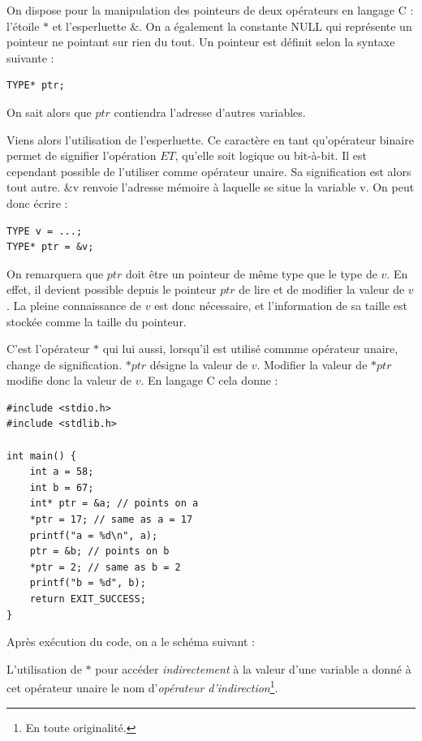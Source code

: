 \documentclass[../../../main.tex]{subfiles}
\begin{document}
On dispose pour la manipulation des pointeurs de deux opérateurs en langage C : l'étoile $\ast$ et l'esperluette $\&$. On a également la constante \textsf{NULL} qui représente un pointeur ne pointant sur rien du tout. 
Un pointeur est définit selon la syntaxe suivante :
\begin{verbatim}
TYPE* ptr;
\end{verbatim}
On sait alors que $ptr$ contiendra l'adresse d'autres variables.
 
Viens alors l'utilisation de l'esperluette. Ce caractère en tant qu'opérateur binaire permet de signifier l'opération $ET$, qu'elle soit logique ou bit-à-bit. Il est cependant possible de l'utiliser comme opérateur unaire. Sa signification est alors tout autre. \textsf{\&v} renvoie l'adresse mémoire à laquelle se situe la variable \textsf{v}. On peut donc écrire :
\begin{verbatim}
TYPE v = ...;
TYPE* ptr = &v;
\end{verbatim}
On remarquera que $ptr$ doit être un pointeur de même type que le type de $v$. En effet, il devient possible depuis le pointeur $ptr$ de lire et de modifier la valeur de $v$. La pleine connaissance de $v$ est donc nécessaire, et l'information de sa taille est stockée comme la taille du pointeur.
 
C'est l'opérateur $*$ qui lui aussi, lorsqu'il est utilisé commme opérateur unaire, change de signification. $*ptr$ désigne la valeur de $v$. Modifier la valeur de $*ptr$ modifie donc la valeur de $v$. En langage C cela donne :
\begin{verbatim}
#include <stdio.h>
#include <stdlib.h>

int main() {
	int a = 58;
	int b = 67;
	int* ptr = &a; // points on a
	*ptr = 17; // same as a = 17
	printf("a = %d\n", a);
	ptr = &b; // points on b
	*ptr = 2; // same as b = 2
	printf("b = %d", b);
	return EXIT_SUCCESS;
}
\end{verbatim}
Après exécution du code, on a le schéma suivant :

\begin{minipage}{\textwidth}
	\begin{center}
		
	\end{center}
\end{minipage}

L'utilisation de $\ast$ pour accéder \textit{indirectement} à la valeur d'une variable a donné à cet opérateur unaire le nom d'\textit{opérateur d'indirection}\footnote{En toute originalité.}.
 
\end{document}
